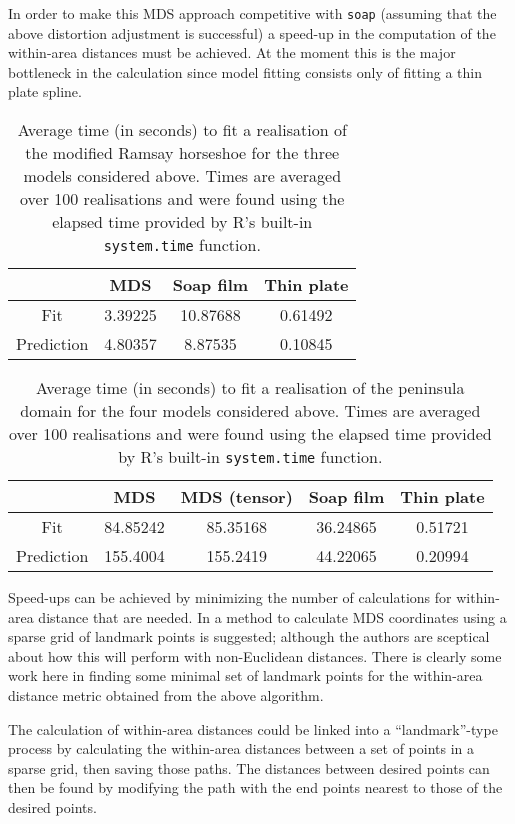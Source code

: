 \documentclass[a4paper,10pt]{article}
\begin{document}
In order to make this MDS approach competitive with \texttt{soap} (assuming that the above distortion adjustment is successful) a speed-up in the computation of the within-area distances must be achieved. At the moment this is the major bottleneck in the calculation since model fitting consists only of fitting a thin plate spline. 


\begin{table}[ht]
\centering
\begin{tabular}{c || c c c}
 & MDS & Soap film & Thin plate\\ 
\hline
Fit & 3.39225 & 10.87688 & 0.61492\\
Prediction & 4.80357 & 8.87535 & 0.10845\\
\end{tabular}
\label{ramsaytime}
\caption{Average time (in seconds) to fit a realisation of the modified Ramsay horseshoe for the three models considered above. Times are averaged over 100 realisations and were found using the elapsed time provided by \textsf{R}'s built-in \texttt{system.time} function.}
\end{table}


\begin{table}[ht]
\centering
\begin{tabular}{c || c c c c}
 & MDS & MDS (tensor) & Soap film & Thin plate\\ 
\hline
Fit & 84.85242 & 85.35168 & 36.24865 & 0.51721\\
Prediction & 155.4004 & 155.2419 & 44.22065 & 0.20994 \\
\end{tabular}
\label{wt2time}
\caption{Average time (in seconds) to fit a realisation of the peninsula domain for the four models considered above. Times are averaged over 100 realisations and were found using the elapsed time provided by \textsf{R}'s built-in \texttt{system.time} function.}
\end{table}


Speed-ups can be achieved by minimizing the number of calculations for within-area distance that are needed. In \cite{landmark} a method to calculate MDS coordinates using a sparse grid of landmark points is suggested; although the authors are sceptical about how this will perform with non-Euclidean distances. There is clearly some work here in finding some minimal set of landmark points for the within-area distance metric obtained from the above algorithm.

The calculation of within-area distances could be linked into a ``landmark''-type process by calculating the within-area distances between a set of points in a sparse grid, then saving those paths. The distances between desired points can then be found by modifying the path with the end points nearest to those of the desired points.




\end{document}
